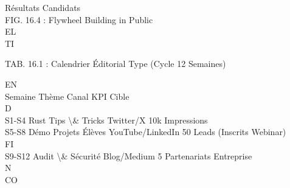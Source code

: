 \vspace{0.5em}
\vspace{0.5em}
\vspace{0.5em}
\vspace{0.5em}
Résultats      Candidats\\
\vspace{0.5em}
\vspace{0.5em}
FIG. 16.4 : Flywheel Building in Public\\
\vspace{0.5em}
\vspace{0.5em}
\vspace{0.5em}
\vspace{0.5em}
EL\\
TI\\
\begin{center}\begin{tabular}TAB. 16.1 : Calendrier Éditorial Type (Cycle 12 Semaines)\end{tabular}\end{center}
\vspace{0.5em}
\vspace{0.5em}
\vspace{0.5em}
\vspace{0.5em}
EN\\
Semaine Thème               Canal            KPI Cible\\
\vspace{0.5em}
\vspace{0.5em}
\vspace{0.5em}
\vspace{0.5em}
D\\
S1-S4   Rust Tips \textbackslash{}& Tricks Twitter/X         10k Impressions\\
S5-S8   Démo Projets Élèves YouTube/LinkedIn 50 Leads (Inscrits Webinar)\\
\vspace{0.5em}
\vspace{0.5em}
\vspace{0.5em}
\vspace{0.5em}
FI\\
S9-S12  Audit \textbackslash{}& Sécurité    Blog/Medium      5 Partenariats Entreprise\\
\vspace{0.5em}
N\\
CO\\
\vspace{0.5em}
\vspace{0.5em}
\vspace{0.5em}

